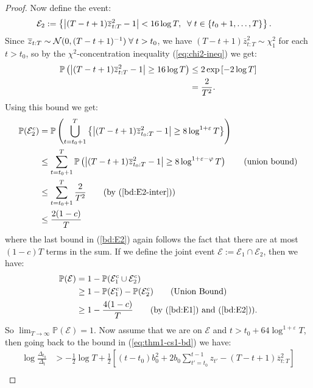 \begin{proof}
Now define the event:
\begin{align*}
    \mathcal{E}_2 &:= \left\{\left|(T-t+1)\overline{z}^2_{t:T} - 1\right| < 16 \log T, \; \;\forall\; t \in\{t_0+1,\ldots,T\}\right\}.
\end{align*}
Since $\overline{z}_{t:T}\sim \mathcal{N}(0,(T-t+1)^{-1}) \;\forall\; t > t_0$, we have $(T-t+1)\overline{z}^2_{t:T}\sim \chi_1^2$ for each $t > t_0$, so by the $\chi^2$-concentration inequality (\ref{eq:chi2-ineq}) we get: 
\begin{align}
    \mathbb{P}\left(\left|(T-t+1)\overline{z}^2_{t:T} - 1\right| \geq 16 \log T\right) &\leq 2\exp\left[-2\log T\right] \notag \\
    &= \frac{2}{T^2}. \label{bd:E2-inter}
\end{align}
Using this bound we get:
\begin{align}
    \mathbb{P}(\mathcal{E}^c_2) &= \mathbb{P}\left(\bigcup_{t = t_0 +1}^T \left\{\left|(T-t+1)\overline{z}^2_{t_0:T} - 1\right| \geq 8 \log^{1+\varepsilon}T\right\} \right) \notag \\
    &\leq \sum_{t = t_0 +1}^T \mathbb{P}\left(\left|(T-t+1)\overline{z}^2_{t_0:T} - 1\right| \geq 8 \log^{1+\varepsilon-\varphi}T\right) \tag{union bound} \\
    &\leq \sum_{t = t_0 +1}^T \frac{2}{T^2} \tag{by (\ref{bd:E2-inter})} \\
    &\leq \frac{2(1- c)}{T} \label{bd:E2} 
\end{align}
where the last bound in (\ref{bd:E2}) again follows the fact that there are at most $(1-c)T$ terms in the sum. If we define the joint event $\mathcal{E} := \mathcal{E}_1 \cap \mathcal{E}_2$, then we have:
\begin{align*}
    \mathbb{P}(\mathcal{E}) &= 1 - \mathbb{P}(\mathcal{E}^c_1 \cup \mathcal{E}^c_2) \\
    &\geq 1 - \mathbb{P}(\mathcal{E}^c_1) - \mathbb{P}(\mathcal{E}^c_2) \tag{Union Bound}  \\
    &\geq 1 - \frac{4(1-c)}{T} \tag{by (\ref{bd:E1}) and (\ref{bd:E2})}.
\end{align*}
So $\lim_{T\to\infty}\mathbb{P}(\mathcal{E}) = 1$. Now assume that we are on $\mathcal{E}$ and $t > t_0 + 64 \log^{1+\varepsilon}T$, then going back to the bound in (\ref{eq:thm1-cs1-bd}) we have:
\begin{align*}
    \log \frac{\Delta_{t_0}}{\Delta_t} &> -\frac{1}{2} \log T + \frac{1}{2} \left[(t-t_0)b_0^2 + 2b_0\sum_{t'=t_0}^{t-1}z_{t'} - (T-t+1)\overline{z}^2_{t:T}\right] \\

\end{align*}
\end{proof}
